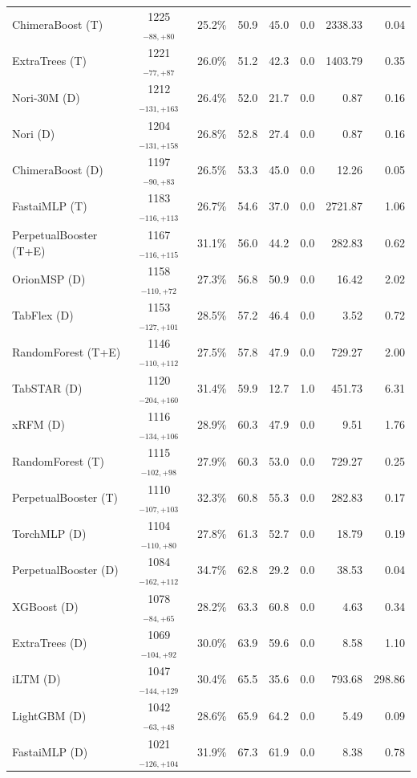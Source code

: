 \begin{tabular}{lcccccrr}
ChimeraBoost (T) & 1225${}_{-88,+80}$ & 25.2\% & 50.9 & 45.0 & 0.0 & 2338.33 & 0.04 \\
ExtraTrees (T) & 1221${}_{-77,+87}$ & 26.0\% & 51.2 & 42.3 & 0.0 & 1403.79 & 0.35 \\
Nori-30M (D) & 1212${}_{-131,+163}$ & 26.4\% & 52.0 & 21.7 & 0.0 & 0.87 & 0.16 \\
Nori (D) & 1204${}_{-131,+158}$ & 26.8\% & 52.8 & 27.4 & 0.0 & 0.87 & 0.16 \\
ChimeraBoost (D) & 1197${}_{-90,+83}$ & 26.5\% & 53.3 & 45.0 & 0.0 & 12.26 & 0.05 \\
FastaiMLP (T) & 1183${}_{-116,+113}$ & 26.7\% & 54.6 & 37.0 & 0.0 & 2721.87 & 1.06 \\
PerpetualBooster (T+E) & 1167${}_{-116,+115}$ & 31.1\% & 56.0 & 44.2 & 0.0 & 282.83 & 0.62 \\
OrionMSP (D) & 1158${}_{-110,+72}$ & 27.3\% & 56.8 & 50.9 & 0.0 & 16.42 & 2.02 \\
TabFlex (D) & 1153${}_{-127,+101}$ & 28.5\% & 57.2 & 46.4 & 0.0 & 3.52 & 0.72 \\
RandomForest (T+E) & 1146${}_{-110,+112}$ & 27.5\% & 57.8 & 47.9 & 0.0 & 729.27 & 2.00 \\
TabSTAR (D) & 1120${}_{-204,+160}$ & 31.4\% & 59.9 & 12.7 & 1.0 & 451.73 & 6.31 \\
xRFM (D) & 1116${}_{-134,+106}$ & 28.9\% & 60.3 & 47.9 & 0.0 & 9.51 & 1.76 \\
RandomForest (T) & 1115${}_{-102,+98}$ & 27.9\% & 60.3 & 53.0 & 0.0 & 729.27 & 0.25 \\
PerpetualBooster (T) & 1110${}_{-107,+103}$ & 32.3\% & 60.8 & 55.3 & 0.0 & 282.83 & 0.17 \\
TorchMLP (D) & 1104${}_{-110,+80}$ & 27.8\% & 61.3 & 52.7 & 0.0 & 18.79 & 0.19 \\
PerpetualBooster (D) & 1084${}_{-162,+112}$ & 34.7\% & 62.8 & 29.2 & 0.0 & 38.53 & 0.04 \\
XGBoost (D) & 1078${}_{-84,+65}$ & 28.2\% & 63.3 & 60.8 & 0.0 & 4.63 & 0.34 \\
ExtraTrees (D) & 1069${}_{-104,+92}$ & 30.0\% & 63.9 & 59.6 & 0.0 & 8.58 & 1.10 \\
iLTM (D) & 1047${}_{-144,+129}$ & 30.4\% & 65.5 & 35.6 & 0.0 & 793.68 & 298.86 \\
LightGBM (D) & 1042${}_{-63,+48}$ & 28.6\% & 65.9 & 64.2 & 0.0 & 5.49 & 0.09 \\
FastaiMLP (D) & 1021${}_{-126,+104}$ & 31.9\% & 67.3 & 61.9 & 0.0 & 8.38 & 0.78 \\

\end{tabular}
